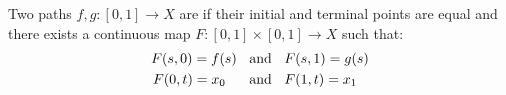 \begin{definition}
    Two paths $f,g:[0,1] \rightarrow X$ are  if their initial and terminal points are equal and there exists a continuous map $F:[0,1] \times [0,1] \rightarrow X$ such that:
        \begin{equation*}
        \begin{split}
            F(s,0) = f(s)\h9&\text{and} \h9 F(s,1) = g(s) \\
            F(0,t) = x_0 \h9\h8&\text{and} \h9 F(1,t) = x_1
        \end{split}
        \end{equation*}
\end{definition}